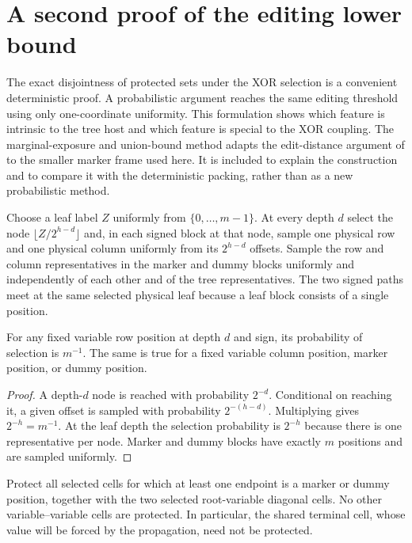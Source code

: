 \section{A second proof of the editing lower bound}\label{sec:probmethod}
The exact disjointness of protected sets under the XOR selection is a
convenient deterministic proof. A probabilistic argument reaches the
same editing threshold using only one-coordinate uniformity. This
formulation shows which feature is intrinsic to the tree host and
which feature is special to the XOR coupling.
The marginal-exposure and union-bound method adapts the edit-distance
argument of \cite{OAI} to the smaller marker frame used here. It is
included to explain the construction and to compare it with the
deterministic packing, rather than as a new probabilistic method.

Choose a leaf label $Z$ uniformly from $\{0,\dots,m-1\}$. At every
depth $d$ select the node $\lfloor Z/2^{h-d}\rfloor$ and, in each
signed block at that node, sample one physical row and one physical
column uniformly from its $2^{h-d}$ offsets. Sample the row and
column representatives in the marker and dummy blocks uniformly
and independently of each other and of the tree representatives.
The two signed paths meet at the same selected physical leaf
because a leaf block consists of a single position.

\begin{lemma}\label{lem:marginal}
For any fixed variable row position at depth $d$ and sign, its
probability of selection is $m^{-1}$. The same is true for a fixed
variable column position, marker position, or dummy position.
\end{lemma}
\begin{proof}
A depth-$d$ node is reached with probability $2^{-d}$.
Conditional on reaching it, a given offset is sampled with
probability $2^{-(h-d)}$. Multiplying gives $2^{-h}=m^{-1}$.
At the leaf depth the selection probability is $2^{-h}$ because
there is one representative per node. Marker and dummy blocks have
exactly $m$ positions and are sampled uniformly.
\end{proof}

Protect all selected cells for which at least one endpoint is a
marker or dummy position, together with the two selected
root-variable diagonal cells. No other variable--variable cells
are protected. In particular, the shared terminal cell, whose
value will be forced by the propagation, need not be protected.


